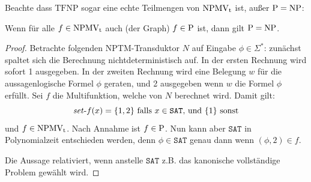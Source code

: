 Beachte dass $\mathrm{TFNP}$ sogar eine echte Teilmengen von $\NPMVt$ ist, außer $\P=\NP$:
\begin{observation}
    Wenn für alle $f\in\NPMVt$ auch (der Graph) $f\in \P$ ist, dann gilt $\P=\NP$.
\end{observation}
\begin{proof}
    Betrachte folgenden NPTM-Transduktor $N$ auf Eingabe $\phi\in\Sigma^*$: zunächst spaltet sich die Berechnung nichtdeterministisch auf. In der ersten Rechnung wird sofort 1 ausgegeben. In der zweiten Rechnung wird eine Belegung $w$ für die aussagenlogische Formel $\phi$ geraten, und 2 ausgegeben wenn $w$ die Formel $\phi$ erfüllt. Sei $f$ die Multifunktion, welche von $N$ berechnet wird.
    Damit gilt:
    \[ \fset{}f(x) = \{ 1, 2\} \text{ falls $x\in\mathtt{SAT}$, und } \{ 1\} \text{ sonst} \]
    und $f\in\NPMVt$.
    Nach Annahme ist $f\in \P$. Nun kann aber $\mathtt{SAT}$ in Polynomialzeit entschieden werden, denn $\phi\in\mathtt{SAT}$ genau dann wenn $(\phi, 2) \in f$.

    Die Aussage relativiert, wenn anstelle $\mathtt{SAT}$ z.B. das kanonische vollständige Problem gewählt wird.
\end{proof}

